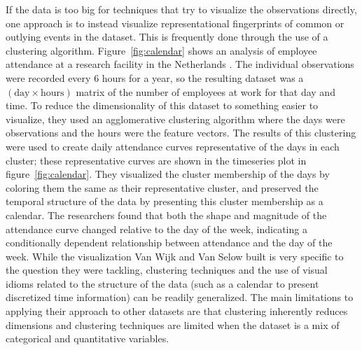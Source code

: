 \documentclass[../main.tex]{subfiles}
\begin{document}
If the data is too big for techniques that try to visualize the observations directly, one approach is to instead visualize representational fingerprints of common or outlying events in the dataset. This is frequently done through the use of a clustering algorithm. Figure~\ref{fig:calendar} shows an analysis of employee attendance at a research facility in the Netherlands \cite{van_wijk_cluster_1999}. The individual observations were recorded every 6 hours for a year, so the resulting dataset was a $(\text{day} \times \text{hours})$ matrix of the number of employees at work for that day and time. To reduce the dimensionality of this dataset to something easier to visualize, they used an agglomerative clustering algorithm \cite{kaufman_agglomerative_1990} where the days were observations and the hours were the feature vectors. The results of this clustering were used to create daily attendance curves representative of the days in each cluster; these representative curves are shown in the timeseries plot in figure~\ref{fig:calendar}. They visualized the cluster membership of the days by coloring them the same as their representative cluster, and preserved the temporal structure of the data by presenting this cluster membership as a calendar. The researchers found that both the shape and magnitude of the attendance curve changed relative to the day of the week, indicating a conditionally dependent relationship between attendance and the day of the week. While the visualization Van Wijk and Van Selow built is very specific to the question they were tackling, clustering techniques and the use of visual idioms related to the structure of the data (such as a calendar to present discretized time information) can be readily generalized. The main limitations to applying their approach to other datasets are that clustering inherently reduces dimensions and clustering techniques are limited when the dataset is a mix of categorical and quantitative variables.
\end{document}
